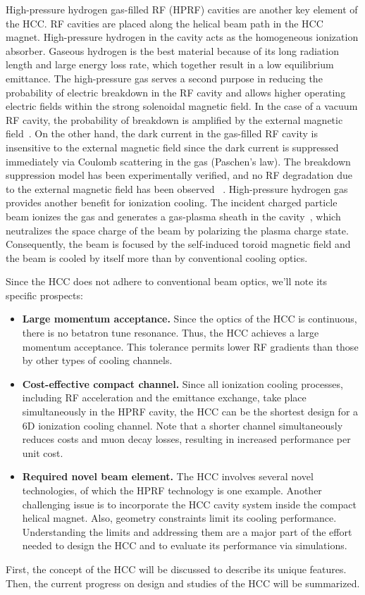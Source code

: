 \documentclass[11pt]{article}
\begin{document}
High-pressure hydrogen gas-filled RF (HPRF) cavities are another key element of the HCC. 
RF cavities are placed along the helical beam path in the HCC magnet. 
High-pressure hydrogen in the cavity acts as the homogeneous ionization absorber. 
Gaseous hydrogen is the best material because of its long radiation length and large energy loss rate, which together result in a low equilibrium emittance. 
The high-pressure gas serves a second purpose in reducing the probability of electric breakdown in the RF cavity and allows higher operating electric fields within the strong solenoidal magnetic field. 
In the case of a vacuum RF cavity, the probability of breakdown is amplified by the external magnetic field~\cite{Moretti, Palmer}. On the other hand, the dark current in the gas-filled RF cavity is insensitive to the external magnetic field since the dark current is suppressed immediately via Coulomb scattering in the gas (Paschen's law). The breakdown suppression model has been experimentally verified, and no RF degradation due to the external magnetic field has been observed ~\cite{Hanlet06}. 
High-pressure hydrogen gas provides another benefit for ionization cooling. The incident charged particle  beam ionizes the gas and generates a gas-plasma sheath in the cavity~\cite{freemire2016}, which
neutralizes the space charge of the beam by polarizing the plasma charge state. Consequently, the beam is focused by the self-induced toroid magnetic field and the beam is cooled by itself more than by conventional cooling optics. 

Since the HCC does not adhere to conventional beam optics, we'll note its specific prospects:
\begin{itemize}
    \item \textbf{Large momentum acceptance.}
    Since the optics of the HCC is continuous, there is no betatron tune resonance. 
    Thus, the HCC achieves a large momentum acceptance. 
    This tolerance permits lower RF gradients than those by other types of cooling channels. 
    \item \textbf{Cost-effective compact channel.}
    Since all ionization cooling processes, including RF acceleration and the emittance exchange, take place simultaneously in the HPRF cavity, the HCC can be the shortest design for a 6D ionization cooling channel. Note that a shorter channel simultaneously reduces costs and muon decay losses, resulting in increased performance per unit cost. 
    \item \textbf{Required novel beam element.}
    The HCC involves several novel technologies, of which the HPRF technology is one example. 
    Another challenging issue is to incorporate the HCC cavity system inside the compact helical magnet. Also, geometry constraints limit its cooling performance. 
    Understanding the limits and addressing them are a major part of the effort needed to design the HCC and to evaluate its performance via simulations. 
\end{itemize}
First, the concept of the HCC will be discussed to describe its unique features. 
Then, the current progress on design and studies of the HCC will be summarized. 
\end{document}
